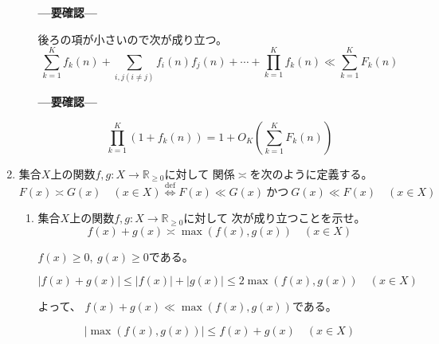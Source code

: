 \documentclass[12pt,b5paper]{ltjsarticle}
\begin{document}
\begin{enumerate}
\begin{enumerate}
            \textbf{---要確認---}

            後ろの項が小さいので次が成り立つ。
            \begin{equation}
               \sum_{k=1}^{K} f_{k}(n)
              + \sum_{i,j(i\ne j)} f_{i}(n) f_{j}(n) + \cdots
              + \prod_{k=1}^{K} f_{k}(n)
              \ll
              \sum_{k=1}^{K} F_k(n)
            \end{equation}

            \textbf{---要確認---}


            \begin{equation}
             \prod_{k=1}^{K} (1 + f_{k}(n))
              = 1 + O_{K}\left( \sum_{k=1}^{K}F_{k}(n) \right)
            \end{equation}


            \hrulefill
      \end{enumerate}

 \item
      集合$X$上の関数$f,g:X\to\mathbb{R}_{\geq 0}$に対して
      関係$\asymp$を次のように定義する。
      \begin{equation}
       F(x) \asymp G(x) \quad (x\in X)
        \overset{\mathrm{def}}{\iff}
        F(x) \ll G(x) \ \text{かつ} \ G(x) \ll F(x) \quad (x\in X)
      \end{equation}
      \begin{enumerate}
       \item
            集合$X$上の関数$f,g:X\to\mathbb{R}_{\geq 0}$に対して
            次が成り立つことを示せ。
            \begin{equation}
             f(x)+g(x) \asymp \max(f(x),g(x)) \quad (x\in X)
            \end{equation}

            \dotfill

            $f(x)\geq 0,\ g(x)\geq 0$である。

            \begin{equation}
             \lvert f(x)+g(x) \rvert
              \leq \lvert f(x) \rvert + \lvert g(x) \rvert
              \leq 2 \max(f(x),g(x)) \quad (x\in X)
            \end{equation}

            よって、
            $f(x)+g(x) \ll \max(f(x),g(x))$である。

            \begin{equation}
             \lvert \max(f(x),g(x)) \rvert
              \leq f(x)+g(x)
              \quad (x\in X)
            \end{equation}


\end{enumerate}
\end{enumerate}
\end{document}
